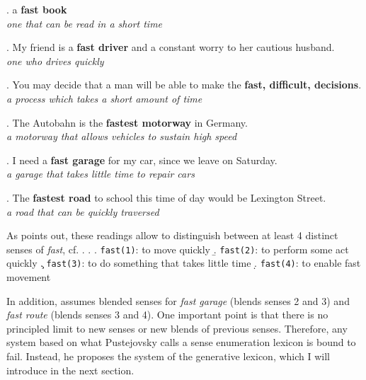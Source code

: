 \ex. a \textbf{fast book}\\
\emph{one that can be read in a short time} 

\ex. My friend is a \textbf{fast driver} and a constant worry to her cautious husband.\\
\emph{one who drives quickly} 

\ex. You may decide that a man will be able to make the \textbf{fast, difficult, decisions}.\\
\emph{a process which takes a short amount of time} 

\ex. The Autobahn is the \textbf{fastest motorway} in Germany.\\
\emph{a motorway that allows vehicles to sustain high speed} 

\ex. I need a \textbf{fast garage} for my car, since we leave on Saturday.\\
\emph{a garage that takes little time to repair cars} 

\ex. The \textbf{fastest road} to school this time of day would be Lexington Street.\\
\emph{a road that can be quickly traversed} 

As \citet[44--45]{Pustejovsky:1995} points out, these readings allow to
distinguish between at least 4 distinct senses of \emph{fast}, cf. \Next. 
\ex. 
\a. \texttt{fast(1)}: to move quickly
\b. \texttt{fast(2)}: to perform some act quickly
\c. \texttt{fast(3)}: to do something that takes little time
\d. \texttt{fast(4)}: to enable fast movement

In addition, \citet[46]{Pustejovsky:1995} assumes blended senses for
\emph{fast garage} (blends senses 2 and 3) and \emph{fast route} (blends senses 3 and
4). One important point is that there is no principled limit to new
senses or new blends of previous senses. Therefore, any system based
on what Pustejovsky calls a sense enumeration lexicon is bound to
fail. Instead, he proposes the system of the generative lexicon, which
I will introduce in the next section.


